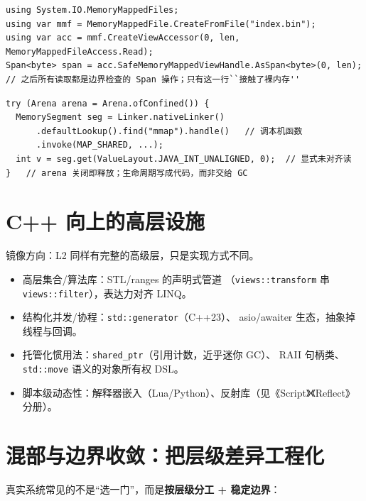 \documentclass[12pt,a4paper,fontset=fandol]{ctexbook}
\begin{document}
\begin{lstlisting}[style=csharpstyle,caption={台阶 3：C\# 的 mmap 风格零拷贝读取（unsafe + Span 的混合体）}]
using System.IO.MemoryMappedFiles;
using var mmf = MemoryMappedFile.CreateFromFile("index.bin");
using var acc = mmf.CreateViewAccessor(0, len, MemoryMappedFileAccess.Read);
Span<byte> span = acc.SafeMemoryMappedViewHandle.AsSpan<byte>(0, len);
// 之后所有读取都是边界检查的 Span 操作；只有这一行``接触了裸内存''
\end{lstlisting}

\begin{lstlisting}[style=javastyle,caption={台阶 3 的 Java 现代版：FFM API（Java 21+）}]
try (Arena arena = Arena.ofConfined()) {
  MemorySegment seg = Linker.nativeLinker()
      .defaultLookup().find("mmap").handle()   // 调本机函数
      .invoke(MAP_SHARED, ...);
  int v = seg.get(ValueLayout.JAVA_INT_UNALIGNED, 0);  // 显式未对齐读
}   // arena 关闭即释放；生命周期写成代码，而非交给 GC
\end{lstlisting}

\section{C++ 向上的高层设施}

镜像方向：L2 同样有完整的高级层，只是实现方式不同。

\begin{itemize}
  \item 高层集合/算法库：STL/ranges 的声明式管道
        （\texttt{views::transform} 串 \texttt{views::filter}），表达力对齐 LINQ。
  \item 结构化并发/协程：\texttt{std::generator}（C++23）、
         asio/awaiter 生态，抽象掉线程与回调。
  \item 托管化惯用法：\texttt{shared\_ptr}（引用计数，近乎迷你 GC）、
        RAII 句柄类、\texttt{std::move} 语义的对象所有权 DSL。
  \item 脚本级动态性：解释器嵌入（Lua/Python）、反射库（见《Script》《Reflect》分册）。
\end{itemize}

\section{混部与边界收敛：把层级差异工程化}

真实系统常见的不是``选一门''，而是\textbf{按层级分工 + 稳定边界}：
\end{document}
